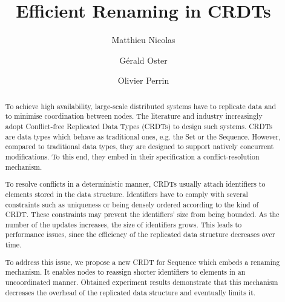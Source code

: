 \documentclass[sigplan,10pt]{acmart}
\begin{document}
\title{Efficient Renaming in \acp{CRDT}}

\author{Matthieu Nicolas}

\author{Gérald Oster}

\author{Olivier Perrin}

\begin{abstract}
To achieve high availability, large-scale distributed systems have to replicate data and to minimise coordination between nodes. The literature and industry increasingly adopt Conflict-free Replicated Data Types (CRDTs) to design such systems. CRDTs are data types which behave as traditional ones, e.g. the Set or the Sequence. However, compared to traditional data types, they are designed to support natively concurrent modifications. To this end, they embed in their specification a conflict-resolution mechanism.

To resolve conflicts in a deterministic manner, CRDTs usually attach identifiers to elements stored in the data structure. Identifiers have to comply with several constraints such as uniqueness or being densely ordered according to the kind of CRDT. These constraints may prevent the identifiers’ size from being bounded. As the number of the updates increases, the size of identifiers grows. This leads to performance issues, since the efficiency of the replicated data structure decreases over time.

To address this issue, we propose a new CRDT for Sequence which embeds a renaming mechanism. It enables nodes to reassign shorter identifiers to elements in an uncoordinated manner. Obtained experiment results demonstrate that this mechanism decreases the overhead of the replicated data structure and eventually limits it.
\end{abstract}


\maketitle
\end{document}
